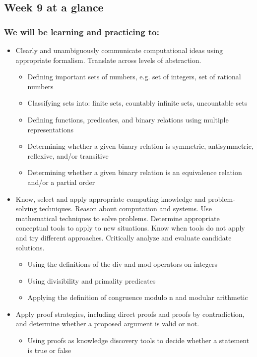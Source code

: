 \subsection*{Week 9 at a glance}

\subsubsection*{We will be learning and practicing to:}
\begin{itemize}

\item Clearly and unambiguously communicate computational ideas using appropriate formalism. Translate across levels of abstraction.
\begin{itemize}
    \item Defining important sets of numbers, e.g. set of integers, set of rational numbers
    \item Classifying sets into: finite sets, countably infinite sets, uncountable sets
    \item Defining functions, predicates, and binary relations using multiple representations
    \item Determining whether a given binary relation is symmetric, antisymmetric, reflexive, and/or transitive
    \item Determining whether a given binary relation is an equivalence relation and/or a partial order
\end{itemize}

\item Know, select and apply appropriate computing knowledge and problem-solving techniques. Reason about computation and systems. Use mathematical techniques to solve problems. Determine appropriate conceptual tools to apply to new situations. Know when tools do not apply and try different approaches. Critically analyze and evaluate candidate solutions.
\begin{itemize}
    \item Using the definitions of the div and mod operators on integers
    \item Using divisibility and primality predicates
    \item Applying the definition of congruence modulo n and modular arithmetic
\end{itemize}

\item Apply proof strategies, including direct proofs and proofs by contradiction, and determine whether a proposed argument is valid or not.
\begin{itemize}
    \item Using proofs as knowledge discovery tools to decide whether a statement is true or false
\end{itemize}
\end{itemize}

